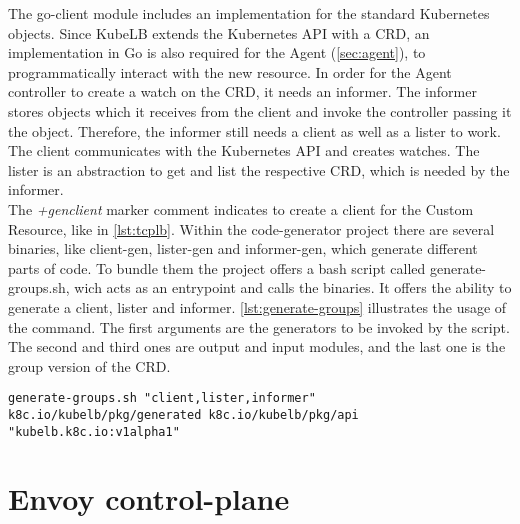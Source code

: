 The go-client module includes an implementation for the standard Kubernetes objects.
Since KubeLB extends the Kubernetes API with a CRD, an implementation in Go is also required for the Agent (\autoref{sec:agent}), to programmatically interact with the new resource.
In order for the Agent controller to create a watch on the CRD, it needs an informer.
The informer stores objects which it receives from the client and invoke the controller passing it the object.
Therefore, the informer still needs a client as well as a lister to work.
The client communicates with the Kubernetes API and creates watches.
The lister is an abstraction to get and list the respective CRD, which is needed by the informer.
\\
The \textit{+genclient} marker comment indicates to create a client for the Custom Resource, like in \autoref{lst:tcplb}.
Within the code-generator project there are several binaries, like client-gen, lister-gen and informer-gen, which generate different parts of code.
To bundle them the project offers a bash script called generate-groups.sh, wich acts as an entrypoint and calls the binaries.
It offers the ability to generate a client, lister and informer.
\autoref{lst:generate-groups} illustrates the usage of the command.
The first arguments are the generators to be invoked by the script.
The second and third ones are output and input modules, and the last one is the group version of the CRD.

\begin{lstlisting}[numbers=none, caption={Generate client, informer and lister with code-generator}, label={lst:generate-groups}]
	generate-groups.sh "client,lister,informer" k8c.io/kubelb/pkg/generated k8c.io/kubelb/pkg/api "kubelb.k8c.io:v1alpha1"
\end{lstlisting}

\section{Envoy control-plane}\label{sec:envoy-control-plane}

